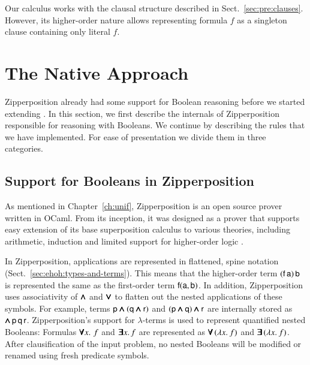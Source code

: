 Our calculus works with the clausal structure described in Sect.~\ref{sec:pre:clauses}.
However, its higher-order nature allows representing formula $f$ as a singleton clause
containing only literal $f$.

\section{The Native Approach} 
\label{sect:bool:native}

Zipperposition already had some support for Boolean reasoning before we
started extending \lsup{}. In this section, we first
describe the internals of Zipperposition responsible for reasoning with
Booleans. We continue by describing the rules that we have
implemented. For ease of presentation we divide them in three categories.
\subsection{Support for Booleans in Zipperposition}
\label{subsect:bool:zip-bools}

As mentioned in Chapter~\ref{ch:unif}, Zipperposition is an open source prover
written in OCaml. From its inception, it was designed as a prover that supports
easy extension of its base superposition calculus to various theories, including
arithmetic, induction and limited support for higher-order logic
\cite{sc-15-simon-phd,sc-supind-17}.

In Zipperposition, applications are represented in flattened, spine notation (Sect.~\ref{sec:ehoh:types-and-terms}).
This means that the higher-order term $(\mathsf{f} \, \mathsf{a}) \, \mathsf{b}$ is
represented the same as the first-order term $\mathsf{f}(\mathsf{a}, \mathsf{b})$. In
addition, Zipperposition uses associativity of $\pmb{\land}$ and $\pmb{\lor}$ to flatten out
the nested applications of these symbols. For example, terms $\mathsf{p} \pmb{\land}
(\mathsf{q} \pmb{\land} \mathsf{r})$ and $(\mathsf{p} \pmb{\land} \mathsf{q}) \pmb{\land} \mathsf{r}$ are
internally stored as $\pmb{\land} \, \mathsf{p} \, \mathsf{q} \, \mathsf{r}$. Zipperposition's
support for $\lambda$-terms is used to represent quantified nested Booleans:
Formulas $\pmb{\forall} x. \, \, f$ and $\pmb{\exists} x. \, f$ are represented as
$\pmb{\forall} \, (\lambda x.\> f)$ and $\pmb{\exists} \, (\lambda x.\> f)$. After clausification of
the input problem, no nested Booleans will be modified or renamed using fresh
predicate symbols.

